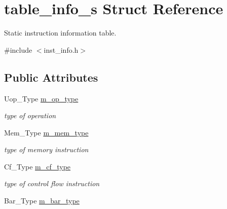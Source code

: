 \hypertarget{structtable__info__s}{
\section{table\_\-info\_\-s Struct Reference}
\label{structtable__info__s}
}


Static instruction information table.  




{\ttfamily \#include $<$inst\_\-info.h$>$}

\subsection*{Public Attributes}
\begin{DoxyCompactItemize}
\item 
\hypertarget{structtable__info__s_accea95bdf8c4c346921cf65bb479c74f}{
Uop\_\-Type \hyperlink{structtable__info__s_accea95bdf8c4c346921cf65bb479c74f}{m\_\-op\_\-type}}
\label{structtable__info__s_accea95bdf8c4c346921cf65bb479c74f}

\begin{DoxyCompactList}\small\item\em type of operation \item\end{DoxyCompactList}\item 
\hypertarget{structtable__info__s_ab8bfe12975e9dc2ef5451f1f1e71865f}{
Mem\_\-Type \hyperlink{structtable__info__s_ab8bfe12975e9dc2ef5451f1f1e71865f}{m\_\-mem\_\-type}}
\label{structtable__info__s_ab8bfe12975e9dc2ef5451f1f1e71865f}

\begin{DoxyCompactList}\small\item\em type of memory instruction \item\end{DoxyCompactList}\item 
\hypertarget{structtable__info__s_a8b8b484d6b311b1b4de9371d31682c6a}{
Cf\_\-Type \hyperlink{structtable__info__s_a8b8b484d6b311b1b4de9371d31682c6a}{m\_\-cf\_\-type}}
\label{structtable__info__s_a8b8b484d6b311b1b4de9371d31682c6a}

\begin{DoxyCompactList}\small\item\em type of control flow instruction \item\end{DoxyCompactList}\item 
\hypertarget{structtable__info__s_a52fddea87fe605b6de294d60f637c7d0}{
Bar\_\-Type \hyperlink{structtable__info__s_a52fddea87fe605b6de294d60f637c7d0}{m\_\-bar\_\-type}}
\label{structtable__info__s_a52fddea87fe605b6de294d60f637c7d0}


\end{DoxyCompactItemize}
